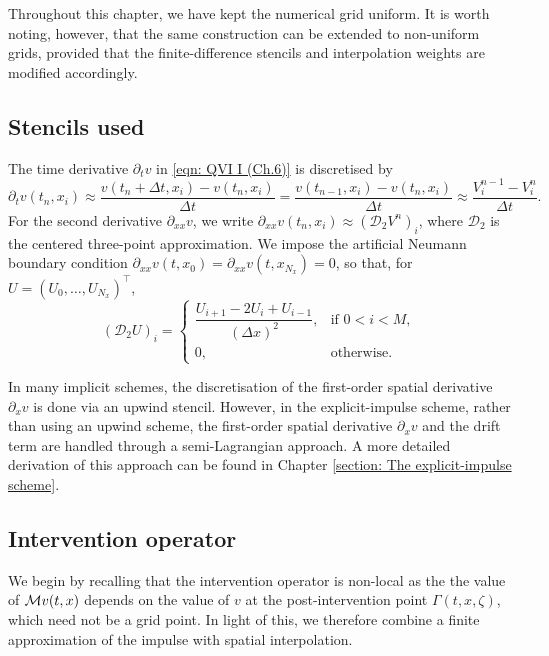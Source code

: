\begin{remark}
    Throughout this chapter, we have kept the numerical grid uniform. It is worth noting, however, that the same construction can be extended to non-uniform grids, provided that the finite-difference stencils and interpolation weights are modified accordingly.
\end{remark}

\subsection{Stencils used}
\label{section: Stencils used}
The time derivative $\partial_t v$ in \eqref{eqn: QVI I (Ch.6)} is discretised by
\begin{equation}
    \partial_t v(t_n,x_i) \approx \frac{v(t_n+\Delta t, x_i) - v(t_n,x_i)}{\Delta t} = \frac{v(t_{n-1}, x_i) - v(t_n,x_i)}{\Delta t} \approx \frac{V_i^{n-1}-V_i^n}{\Delta t}.
    \label{eqn: time stencil}
\end{equation}
For the second derivative $\partial_{xx}v$, we write $\partial_{xx}v(t_n,x_i) \approx (\mathcal{D}_2V^n)_i$, where $\mathcal{D}_2$ is the centered three-point approximation. We impose the artificial Neumann boundary condition $\partial_{xx}v(t,x_0) = \partial_{xx}v(t,x_{N_x}) = 0$, so that, for $U=(U_0, \ldots, U_{N_x})^\top$, 
\begin{equation}
    (\mathcal{D}_2U)_i =
    \begin{cases}
        \dfrac{U_{i+1}-2U_i+U_{i-1}}{(\Delta x)^2}, & \text{if } 0 < i < M, \\[1ex]
        0, & \text{otherwise}.
    \end{cases}
    \label{eqn: second derivative stencil}
\end{equation}

In many implicit schemes, the discretisation of the first-order spatial derivative $\partial_x v$ is done via an upwind stencil. However, in the explicit-impulse scheme, rather than using an upwind scheme, the first-order spatial derivative $\partial_x v$ and the drift term are handled through a semi-Lagrangian approach. A more detailed derivation of this approach can be found in Chapter \ref{section: The explicit-impulse scheme}.


\subsection{Intervention operator}
\label{section: Intervention operator}

We begin by recalling that the intervention operator is non-local as the the value of $\mathcal{M} v(t,x)$ depends on the value of $v$ at the post-intervention point $\Gamma(t,x,\zeta)$, which need not be a grid point. In light of this, we therefore combine a finite approximation of the impulse with spatial interpolation.

